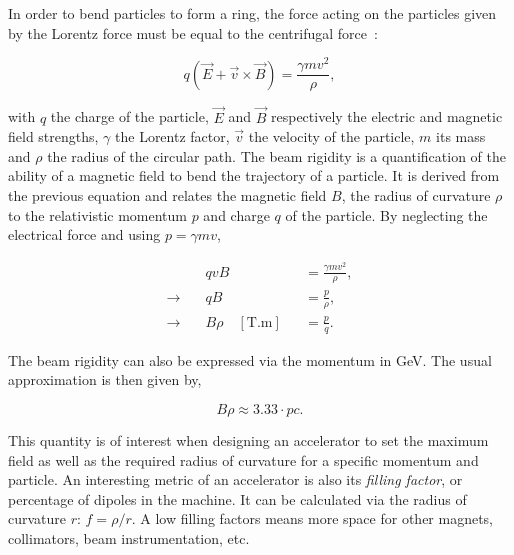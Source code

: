 In order to bend particles to form a ring, the force acting on the particles given by the Lorentz
force must be equal to the centrifugal force~\cite{holzer_design_2020,wiedemann_particle_2015}:

\begin{equation}
    q(\vec{E} + \vec{v} \times \vec{B}) = \frac{\gamma mv^2}{\rho},
\end{equation}

with $q$ the charge of the particle, $\vec{E}$ and $\vec{B}$ respectively the electric and magnetic
field strengths, $\gamma$ the Lorentz factor, $\vec{v}$ the velocity of the particle, $m$ its mass
and $\rho$ the radius of the circular path. 
The beam rigidity is a quantification of the ability of a magnetic field to bend the trajectory of a
particle. It is derived from the previous equation and relates the
magnetic field $B$, the radius of curvature $\rho$ to the relativistic momentum $p$ and charge $q$
of the particle. By neglecting the electrical force and using $p = \gamma mv$,

\begin{equation}
    \begin{aligned}
                           & qvB &&= \frac{\gamma mv^2}{\rho}, \\
        \rightarrow  \quad & qB &&= \frac{p}{\rho}, \\
        \rightarrow  \quad & B\rho \quad [\textrm{T.m}] &&= \frac{p}{q}.
    \end{aligned}
    \label{eq:magnetic_fields_beam_rigidity}
\end{equation}

The beam rigidity can also be expressed via the momentum in GeV. The usual approximation is then
given by,

\begin{equation}
    B \rho \approx 3.33 \cdot pc.
\end{equation}

This quantity is of interest when designing an accelerator to set the maximum field as well as the required
radius of curvature for a specific momentum and particle.
An interesting metric of an accelerator is also its \textit{filling factor}, or percentage of
dipoles in the machine. It can be calculated via the radius of curvature $r$: $f = \rho / r$. A low 
filling factors means more space for other magnets, collimators, beam instrumentation, etc.

\subsubsection{}

